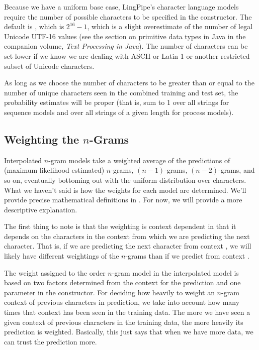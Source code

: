 Because we have a uniform base case, LingPipe's character language
models require the number of possible characters to be specified in
the constructor.  The default is , which is
$2^{16}-1$, which is a slight overestimate of the number of legal Unicode
UTF-16 values (see the section on primitive data types in Java in
the companion volume, {\it Text Processing in Java}).  The number of characters
can be set lower if we know we are dealing with ASCII or Latin 1 or
another restricted subset of Unicode characters.  

As long as we choose the number of characters to be greater than or
equal to the number of unique characters seen in the combined training and
test set, the probability estimates will be proper (that is, sum to
1 over all strings for sequence models and over all strings of a given
length for process models).


\subsection{Weighting the $n$-Grams}

Interpolated $n$-gram models take a weighted average of the
predictions of (maximum likelihood estimated) $n$-grams,
$(n-1)$-grams, $(n-2)$-grams, and so on, eventually bottoming out with
the uniform distribution over characters.  What we haven't said is how
the weights for each model are determined.  We'll provide precise
mathematical definitions in .  For now, we will
provide a more descriptive explanation.

The first thing to note is that the weighting is context dependent in
that it depends on the characters in the context from which we are
predicting the next character.  That is, if we are predicting the next
character from context , we will likely have
different weightings of the $n$-grams than if we predict from context
.

The weight assigned to the order $n$-gram model in the interpolated
model is based on two factors determined from the context for the
prediction and one parameter in the constructor.  For deciding how
heavily to weight an $n$-gram context of previous characters in
prediction, we take into account how many times that context has been
seen in the training data.  The more we have seen a given context of
previous characters in the training data, the more heavily its prediction
is weighted.  Basically, this just says that when we have more data,
we can trust the prediction more.  

